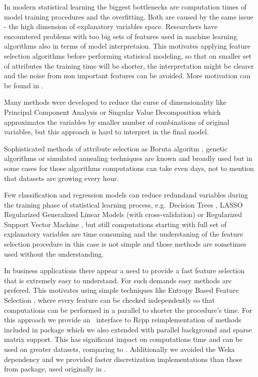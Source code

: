 In modern statistical learning the biggest bottlenecks are computation
times of model training procedures and the overfitting. Both are caused
by the same issue - the high dimension of explanatory variables space.
Researchers have encountered problems with too big sets of features used
in machine learning algorithms also in terms of model interpretaion.
This motivates applying feature selection algorithms before performing
statisical modeling, so that on smaller set of attributes the training
time will be shorter, the interpretation might be clearer and the noise
from non important features can be avoided. More motivation can be found
in \cite{John94irrelevantfeatures}. \par Many methods were developed to
reduce the curse of dimensionality like Principal Component Analysis
\citep{PCA:14786440109462720} or Singular Value Decomposition
\citep{eckart1936approximation} which approximates the variables by
smaller number of combinations of original variables, but this approach
is hard to interpret in the final model. \par Sophisticated methods of
attribute selection as Boruta algoritm \citep{Boruta}, genetic
algorithms \citep{geneticAlgo, FedCSIS2013l106} or simulated annealing
techniques \citep{Khachaturyan:a19748} are known and broadly used but in
some cases for those algorithms computations can take even days, not to
mention that datasets are growing every hour. \par Few classification
and regression models can reduce redundand variables during the training
phase of statistical learning process, e.g.~Decision Trees
\citep{Rokach:2008:DMD:1796114, cart84}, LASSO Regularized Generalized
Linear Models (with cross-validation) \citep{glmnet} or Regularized
Support Vector Machine \citep{Xu:2009:RRS:1577069.1755834}, but still
computations starting with full set of explanatory variables are time
consuming and the understaning of the feature selection procedure in
this case is not simple and those methods are sometimes used without the
understanding. \par In business applications there appear a need to
provide a fast feature selection that is extremely easy to understand.
For such demands easy methods are prefered. This motivates using simple
techniques like Entropy Based Feature Selection
\citep{Largeron:2011:EBF:1982185.1982389}, where every feature can be
checked independently so that computations can be performed in a
parallel to shorter the procedure's time. For this approach we provide
an \R ~interface to Rcpp reimplementation \citep{Rcpp} of methods
included in  package which we also extended with parallel
background and sparse matrix support. This has significant impact on
computations time and can be used on greater datasets, comparing to
. Additionally we avoided the Weka
\citep{Hall:2009:WDM:1656274.1656278} dependency and we provided faster
discretization implementations than those from  package,
used originally in .

